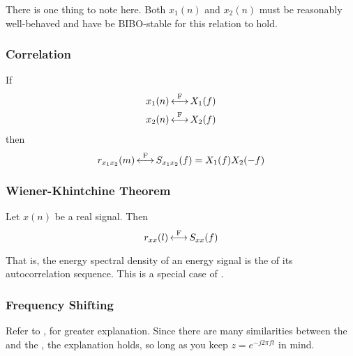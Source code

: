 \begin{remark*}
  There is one thing to note here.
  Both $x_{1}(n)$ and $x_{2}(n)$ must be reasonably well-behaved and have be BIBO-stable for this relation to hold.
\end{remark*}

\subsubsection{Correlation}\label{subsubsec:FourierTransformProperties-Correlation}
If
\begin{equation*}
  \begin{aligned}
    x_{1}(n) &\operatorname{\overset{F}{\longleftrightarrow}} X_{1}(f) \\
    x_{2}(n) &\operatorname{\overset{F}{\longleftrightarrow}} X_{2}(f) \\
  \end{aligned}
\end{equation*}
then
\begin{equation}\label{eq:FourierTransformProperties-Correlation}
  r_{x_{1}x_{2}}(m) \operatorname{\overset{F}{\longleftrightarrow}} S_{x_{1}x_{2}}(f) = X_{1}(f)X_{2}(-f)
\end{equation}

\subsubsection{Wiener-Khintchine Theorem}\label{subsubsec:FourierTransformProperties-WienerKhintchineTheorem}
Let $x(n)$ be a real signal. Then
\begin{equation}\label{eq:FourierTransformProperties-WienerKhintchineTheorem}
  r_{xx}(l) \operatorname{\overset{F}{\longleftrightarrow}} S_{xx}(f)
\end{equation}

That is, the energy spectral density of an energy signal is the  of its autocorrelation sequence. This is a special case of .

\subsubsection{Frequency Shifting}\label{subsubsec:FourierTransformProperties-FrequencyShifting}
Refer to ,  for greater explanation.
Since there are many similarities between the  and the , the explanation holds, so long as you keep $z=e^{-j 2\pi ft}$ in mind.

